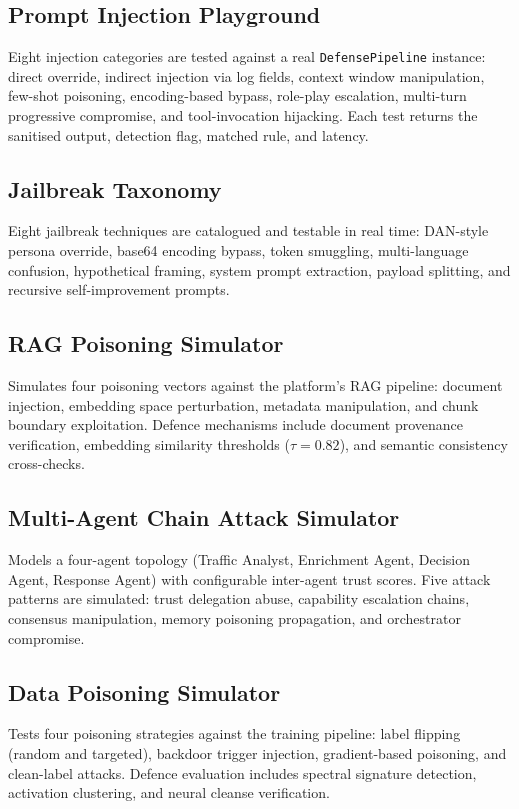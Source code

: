 \subsection{Prompt Injection Playground}
Eight injection categories are tested against a real \texttt{DefensePipeline}
instance: direct override, indirect injection via log fields, context window
manipulation, few-shot poisoning, encoding-based bypass, role-play escalation,
multi-turn progressive compromise, and tool-invocation hijacking.  Each test
returns the sanitised output, detection flag, matched rule, and latency.

\subsection{Jailbreak Taxonomy}
Eight jailbreak techniques are catalogued and testable in real time:
DAN-style persona override, base64 encoding bypass, token smuggling,
multi-language confusion, hypothetical framing, system prompt extraction,
payload splitting, and recursive self-improvement prompts.

\subsection{RAG Poisoning Simulator}
Simulates four poisoning vectors against the platform's RAG pipeline:
document injection, embedding space perturbation, metadata manipulation,
and chunk boundary exploitation.  Defence mechanisms include document
provenance verification, embedding similarity thresholds ($\tau = 0.82$),
and semantic consistency cross-checks.

\subsection{Multi-Agent Chain Attack Simulator}
Models a four-agent topology (Traffic Analyst, Enrichment Agent, Decision
Agent, Response Agent) with configurable inter-agent trust scores.  Five
attack patterns are simulated: trust delegation abuse, capability escalation
chains, consensus manipulation, memory poisoning propagation, and
orchestrator compromise.

\subsection{Data Poisoning Simulator}
Tests four poisoning strategies against the training pipeline: label flipping
(random and targeted), backdoor trigger injection, gradient-based poisoning,
and clean-label attacks.  Defence evaluation includes spectral signature
detection, activation clustering, and neural cleanse verification.

